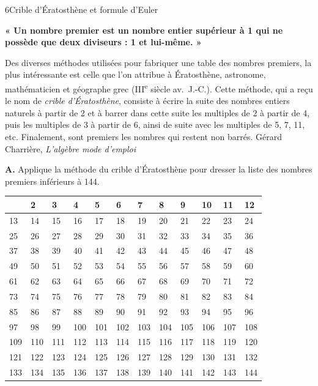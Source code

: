 \begin{exercice}{6}{Crible d'Ératosthène et formule d'Euler}

\textbf{« Un nombre premier est un nombre entier supérieur à 1 qui ne possède que deux diviseurs : 1 et lui-même. »}

\medskip
Des diverses méthodes utilisées pour fabriquer une table des nombres premiers, la plus intéressante est celle que l'on attribue à Ératosthène, astronome, mathématicien et géographe grec (III\textsuperscript{e} siècle av.\ J.-C.). Cette méthode, qui a reçu le nom de \textit{crible d'Ératosthène}, consiste à écrire la suite des nombres entiers naturels à partir de 2 et à barrer dans cette suite les multiples de 2 à partir de 4, puis les multiples de 3 à partir de 6, ainsi de suite avec les multiples de 5, 7, 11, etc. Finalement, sont premiers les nombres qui restent non barrés. \hfill{\small Gérard Charrière, \textit{L'algèbre mode d'emploi}}

\medskip
\textbf{A.} Applique la méthode du crible d'Ératosthène pour dresser la liste des nombres premiers inférieurs à 144.

\medskip
\begin{tabular}{|l|l|l|l|l|l|l|l|l|l|l|l|}
\hline
    & 2   & 3   & 4   & 5   & 6   & 7   & 8   & 9   & 10  & 11  & 12  \\
\hline
13  & 14  & 15  & 16  & 17  & 18  & 19  & 20  & 21  & 22  & 23  & 24  \\
\hline
25  & 26  & 27  & 28  & 29  & 30  & 31  & 32  & 33  & 34  & 35  & 36  \\
\hline
37  & 38  & 39  & 40  & 41  & 42  & 43  & 44  & 45  & 46  & 47  & 48  \\
\hline
49  & 50  & 51  & 52  & 53  & 54  & 55  & 56  & 57  & 58  & 59  & 60  \\
\hline
61  & 62  & 63  & 64  & 65  & 66  & 67  & 68  & 69  & 70  & 71  & 72  \\
\hline
73  & 74  & 75  & 76  & 77  & 78  & 79  & 80  & 81  & 82  & 83  & 84  \\
\hline
85  & 86  & 87  & 88  & 89  & 90  & 91  & 92  & 93  & 94  & 95  & 96  \\
\hline
97  & 98  & 99  & 100 & 101 & 102 & 103 & 104 & 105 & 106 & 107 & 108 \\
\hline
109 & 110 & 111 & 112 & 113 & 114 & 115 & 116 & 117 & 118 & 119 & 120 \\
\hline
121 & 122 & 123 & 124 & 125 & 126 & 127 & 128 & 129 & 130 & 131 & 132 \\
\hline
133 & 134 & 135 & 136 & 137 & 138 & 139 & 140 & 141 & 142 & 143 & 144 \\
\hline
\end{tabular}


\end{exercice}
